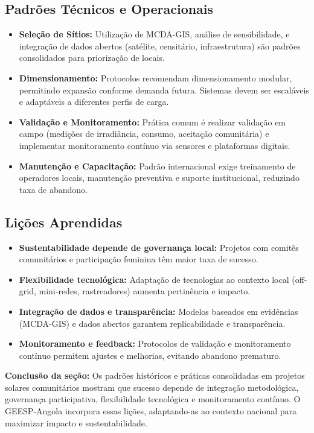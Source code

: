 \documentclass[12pt, a4paper]{article}
\begin{document}
{{{{{{{{{{{\subsection{Padrões Técnicos e Operacionais}
\begin{itemize}
  \item \textbf{Seleção de Sítios:} Utilização de MCDA-GIS, análise de sensibilidade, e integração de dados abertos (satélite, censitário, infraestrutura) são padrões consolidados para priorização de locais.
  \item \textbf{Dimensionamento:} Protocolos recomendam dimensionamento modular, permitindo expansão conforme demanda futura. Sistemas devem ser escaláveis e adaptáveis a diferentes perfis de carga.
  \item \textbf{Validação e Monitoramento:} Prática comum é realizar validação em campo (medições de irradiância, consumo, aceitação comunitária) e implementar monitoramento contínuo via sensores e plataformas digitais.
  \item \textbf{Manutenção e Capacitação:} Padrão internacional exige treinamento de operadores locais, manutenção preventiva e suporte institucional, reduzindo taxa de abandono.
\end{itemize}

\subsection{Lições Aprendidas}
\begin{itemize}
  \item \textbf{Sustentabilidade depende de governança local:} Projetos com comitês comunitários e participação feminina têm maior taxa de sucesso.
  \item \textbf{Flexibilidade tecnológica:} Adaptação de tecnologias ao contexto local (off-grid, mini-redes, rastreadores) aumenta pertinência e impacto.
  \item \textbf{Integração de dados e transparência:} Modelos baseados em evidências (MCDA-GIS) e dados abertos garantem replicabilidade e transparência.
  \item \textbf{Monitoramento e feedback:} Protocolos de validação e monitoramento contínuo permitem ajustes e melhorias, evitando abandono prematuro.
\end{itemize}

\textbf{Conclusão da seção:} Os padrões históricos e práticas consolidadas em projetos solares comunitários mostram que sucesso depende de integração metodológica, governança participativa, flexibilidade tecnológica e monitoramento contínuo. O GEESP-Angola incorpora essas lições, adaptando-as ao contexto nacional para maximizar impacto e sustentabilidade.

}}}}}}}}}}}
\end{document}

